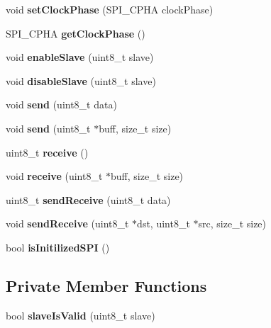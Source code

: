 \begin{DoxyCompactItemize}
void {\bfseries set\+Clock\+Phase} (S\+P\+I\+\_\+\+C\+P\+HA clock\+Phase)
\item 
\mbox{\label{classMasterSPI_a4ab249c40732baf10c84e679716c06bb}} 
S\+P\+I\+\_\+\+C\+P\+HA {\bfseries get\+Clock\+Phase} ()
\item 
\mbox{\label{classMasterSPI_a405be54a885e480053d6bed914ae945b}} 
void {\bfseries enable\+Slave} (uint8\+\_\+t slave)
\item 
\mbox{\label{classMasterSPI_ab68209dd073458c4d9e67c8fe48f0c23}} 
void {\bfseries disable\+Slave} (uint8\+\_\+t slave)
\item 
\mbox{\label{classMasterSPI_ab14828b0e7ba5d57b69416592e967827}} 
void {\bfseries send} (uint8\+\_\+t data)
\item 
\mbox{\label{classMasterSPI_a488585ba1bcc08d0d996351eae1a5846}} 
void {\bfseries send} (uint8\+\_\+t $\ast$buff, size\+\_\+t size)
\item 
\mbox{\label{classMasterSPI_a9fb1e852ea7f95416ac3eb3823fde022}} 
uint8\+\_\+t {\bfseries receive} ()
\item 
\mbox{\label{classMasterSPI_a1ef210d931a745610273733223f813e1}} 
void {\bfseries receive} (uint8\+\_\+t $\ast$buff, size\+\_\+t size)
\item 
\mbox{\label{classMasterSPI_a6b3659712a73698d618d7ce9e6b7fce0}} 
uint8\+\_\+t {\bfseries send\+Receive} (uint8\+\_\+t data)
\item 
\mbox{\label{classMasterSPI_a44270af41c0a3a77e6dd3d57248b062c}} 
void {\bfseries send\+Receive} (uint8\+\_\+t $\ast$dst, uint8\+\_\+t $\ast$src, size\+\_\+t size)
\item 
\mbox{\label{classMasterSPI_ab812254b48ad06a1a3d4da3d7dbd577f}} 
bool {\bfseries is\+Initilized\+S\+PI} ()
\end{DoxyCompactItemize}
\subsection*{Private Member Functions}
\begin{DoxyCompactItemize}
\item 
\mbox{\label{classMasterSPI_ad1442558b7d3ee172b3529d50854b8bc}} 
bool {\bfseries slave\+Is\+Valid} (uint8\+\_\+t slave)
\end{DoxyCompactItemize}
